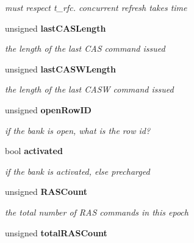 \begin{CompactItemize}
\begin{CompactList}\small\item\em must respect t\_\-rfc. concurrent refresh takes time \item\end{CompactList}\item 
unsigned {\bf lastCASLength}\label{class_d_r_a_m_sim_i_i_1_1bank__c_63f87f98895636889768d652cf36e5c0}

\begin{CompactList}\small\item\em the length of the last CAS command issued \item\end{CompactList}\item 
unsigned {\bf lastCASWLength}\label{class_d_r_a_m_sim_i_i_1_1bank__c_431058ac671c30ccf69181ff4e105887}

\begin{CompactList}\small\item\em the length of the last CASW command issued \item\end{CompactList}\item 
unsigned {\bf openRowID}\label{class_d_r_a_m_sim_i_i_1_1bank__c_20f9e12280bc906b67100bb60848c0c9}

\begin{CompactList}\small\item\em if the bank is open, what is the row id? \item\end{CompactList}\item 
bool {\bf activated}\label{class_d_r_a_m_sim_i_i_1_1bank__c_2a2f19963dd58b2a208f98d9102dc6d9}

\begin{CompactList}\small\item\em if the bank is activated, else precharged \item\end{CompactList}\item 
unsigned {\bf RASCount}\label{class_d_r_a_m_sim_i_i_1_1bank__c_d133c3d65c2b78587237ee15bf21cc70}

\begin{CompactList}\small\item\em the total number of RAS commands in this epoch \item\end{CompactList}\item 
unsigned {\bf totalRASCount}\label{class_d_r_a_m_sim_i_i_1_1bank__c_7d98de285f77bc8d1054b692bdd4bbf4}


\end{CompactItemize}
